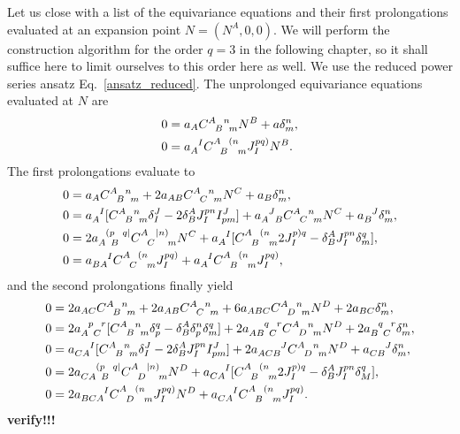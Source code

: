 Let us close with a list of the equivariance equations and their first prolongations evaluated at an expansion point $N = (N^A,0,0)$. We will perform the construction algorithm for the order $q=3$ in the following chapter, so it shall suffice here to limit ourselves to this order here as well. We use the reduced power series ansatz Eq.~\ref{ansatz_reduced}. The unprolonged equivariance equations evaluated at $N$ are
\begin{equation}\label{prolong_0}
  \begin{aligned}
    0 &{} = a_A \gmc{A}{B}{n}{m} N^B + a \delta^n_m, \\
    0 &{} = a_A^{\hphantom AI}\gmc{A}{B}{(n}{m} J^{pq)}_I N^B.
  \end{aligned}
\end{equation}
The first prolongations evaluate to
\begin{equation}\label{prolong_1}
  \begin{aligned}
    0 &{} = a_A \gmc{A}{B}{n}{m} + 2 a_{AB} \gmc{A}{C}{n}{m} N^C + a_B \delta^n_m, \\
    0 &{} = a_A^{\hphantom AI}\lbrack \gmc{A}{B}{n}{m} \delta^J_I - 2\delta^A_B J^{pn}_I I^J_{pm}\rbrack + a_{A\hphantom JB}^{\hphantom AJ}\gmc{A}{C}{n}{m} N^C + a_B^{\hphantom BJ} \delta^n_m, \\
    0 &{} = 2a_{A \hphantom pB}^{\hphantom A(p\hphantom Bq\mid} \gmc{A}{C}{\mid n)}{m} N^C + a_A^{\hphantom AI}\lbrack \gmc{A}{B}{(n}{m} 2J^{p)q}_I - \delta^A_B J^{pn}_I \delta^q_m\rbrack, \\
    0 &{} = a_{BA}^{\hphantom{BA}I} \gmc{A}{C}{(n}{m} J^{pq)}_I + a_A^{\hphantom AI}\gmc{A}{B}{(n}{m} J^{pq)}_I,
  \end{aligned}
\end{equation}
and the second prolongations finally yield
\begin{equation}\label{prolong_2}
  \begin{aligned}
    0 &{} = 2 a_{AC} \gmc{A}{B}{n}{m} + 2 a_{AB} \gmc{A}{C}{n}{m} + 6 a_{ABC} \gmc{A}{D}{n}{m}N^D + 2a_{BC}\delta^n_m, \\
    0 &{} = 2 a_{A\hphantom pC}^{\hphantom Ap\hphantom Cr}\lbrack \gmc{A}{B}{n}{m} \delta^q_p - \delta^A_B\delta^n_p\delta^q_m \rbrack + 2a_{AB\hphantom qC}^{\hphantom{AB}q\hphantom Cr}\gmc{A}{D}{n}{m} N^D + 2a_{B\hphantom qC}^{\hphantom Bq\hphantom Cr}\delta^n_m, \\
    0 &{} = a_{CA}^{\hphantom{CA}I} \lbrack \gmc{A}{B}{n}{m} \delta^J_I - 2 \delta^A_B J^{pn}_I I^J_{pm} \rbrack + 2 a_{ACB}^{\hphantom{ACB}J} \gmc{A}{D}{n}{m} N^D + a_{CB}^{\hphantom{CB}J} \delta^n_m, \\
    0 &{} = 2a_{CA\hphantom{p}B}^{\hphantom{CA}(p\hphantom Bq\mid}\gmc{A}{D}{\mid n)}{m}N^D + a_{CA}^{\hphantom{CA}I} \lbrack \gmc{A}{B}{(n}{m} 2 J^{p)q}_I - \delta^A_B J^{pn}_I \delta^q_M \rbrack, \\
    0 &{} = 2a_{BCA}^{\hphantom{BCA}I} \gmc{A}{D}{(n}{m}J^{pq)}_I N^D + a_{CA}^{\hphantom{CA}I} \gmc{A}{B}{(n}{m} J^{pq)}_I.
  \end{aligned}
\end{equation}
\textbf{verify!!!}
